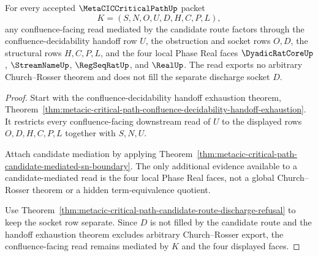 \begin{theorem}
\label{thm:metacic-critical-path-confluence-candidate-mediation}
For every accepted $\MetaCICCriticalPathUp$ packet
$$
K=(S,N,O,U,D,H,C,P,L),
$$
any confluence-facing read mediated by the candidate route factors through the confluence-decidability handoff row $U$, the obstruction and socket rows $O,D$, the structural rows $H,C,P,L$, and the four local Phase Real faces $\DyadicRatCoreUp$, $\StreamNameUp$, $\RegSeqRatUp$, and $\RealUp$. The read exports no arbitrary Church--Rosser theorem and does not fill the separate discharge socket $D$.
\end{theorem}
\begin{proof}
Start with the confluence-decidability handoff exhaustion theorem, Theorem~\ref{thm:metacic-critical-path-confluence-decidability-handoff-exhaustion}. It restricts every confluence-facing downstream read of $U$ to the displayed rows $O,D,H,C,P,L$ together with $S,N,U$.

Attach candidate mediation by applying Theorem~\ref{thm:metacic-critical-path-candidate-mediated-sn-boundary}. The only additional evidence available to a candidate-mediated read is the four local Phase Real faces, not a global Church--Rosser theorem or a hidden term-equivalence quotient.

Use Theorem~\ref{thm:metacic-critical-path-candidate-route-discharge-refusal} to keep the socket row separate. Since $D$ is not filled by the candidate route and the handoff exhaustion theorem excludes arbitrary Church--Rosser export, the confluence-facing read remains mediated by $K$ and the four displayed faces.
\end{proof}

